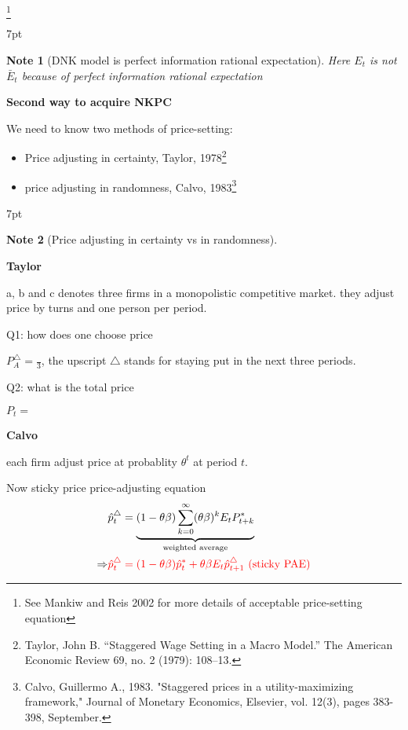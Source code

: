 \documentclass{article}
\newenvironment{blueblock}{
\def\FrameCommand{
  \hspace{1pt}
    {\color{DarkBlue}
    \vrule width 2pt}
    {\color{blueshade}
    \vrule width 4pt}
  \colorbox{blueshade}
}
\MakeFramed{
  \advance
  \hsize-
  \width
  \FrameRestore}
\noindent\hspace{-4.55pt}%
\begin{adjustwidth}{}{7pt}
\vspace{2pt}\vspace{2pt}
}
{\vspace{2pt}\end{adjustwidth}\endMakeFramed}
\newtheorem{note}{Note}
\begin{document}
\footnote{See Mankiw and Reis 2002 for more details of acceptable price-setting equation}

\begin{blueblock}
\begin{note}[DNK model is perfect information rational expectation]
Here $E_t$ is not $\bar E_t$ because of perfect information rational expectation
\end{note}
\end{blueblock}


\textbf{Second way to acquire NKPC}

We need to know two methods of price-setting:
\begin{itemize}
  \item Price adjusting in certainty, Taylor, 1978\footnote{Taylor, John B. “Staggered Wage Setting in a Macro Model.” The American Economic Review 69, no. 2 (1979): 108–13.}
  \item price adjusting in randomness, Calvo, 1983\footnote{Calvo, Guillermo A., 1983. "Staggered prices in a utility-maximizing framework," Journal of Monetary Economics, Elsevier, vol. 12(3), pages 383-398, September.}
\end{itemize}


\begin{blueblock}
\begin{note}[Price adjusting in certainty vs in randomness]
\end{note}
\textbf{Taylor}

a, b and c denotes three firms in a monopolistic competitive market. they adjust price by turns and one person per period.

Q1: how does one choose price

$P_A^\triangle=\frac{}{3}$, the upscript $\triangle$ stands for staying put in the next three periods.

Q2: what is the total price

$P_t=$

\textbf{Calvo}

each firm adjust price at probablity $\theta^t$ at period $t$.

\end{blueblock}


Now sticky price price-adjusting equation
\begin{align}
&\hat p_t^\triangle=\underbrace{(1-\theta \beta)\sum\limits_{k=0}^\infty (\theta \beta)^k E_t P_{t+k}^*}_{\text{weighted average}}
\\\Rightarrow &\color{red} \hat p_t^\triangle=(1-\theta \beta) \hat p_t^* +\theta \beta E_t \hat p_{t+1}^\triangle \text{ (sticky PAE)}
\end{align}
\end{document}
